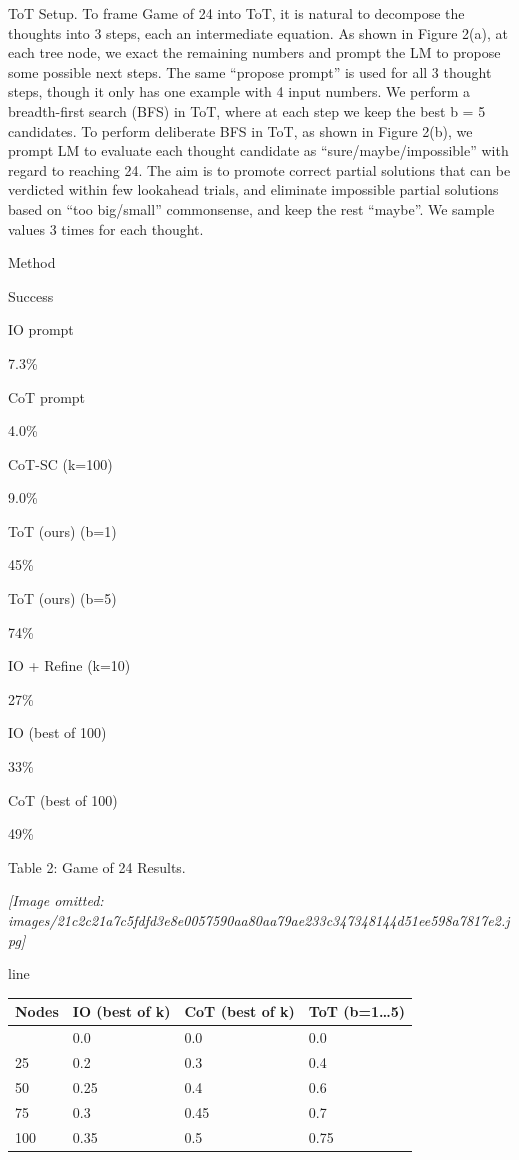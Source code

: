 \documentclass[
]{article}
\newcounter{none} %
\begin{document}
ToT Setup. To frame Game of 24 into ToT, it is natural to decompose the
thoughts into 3 steps, each an intermediate equation. As shown in Figure
2(a), at each tree node, we exact the remaining numbers and prompt the
LM to propose some possible next steps. The same ``propose prompt'' is
used for all 3 thought steps, though it only has one example with 4
input numbers. We perform a breadth-first search (BFS) in ToT, where at
each step we keep the best b = 5 candidates. To perform deliberate BFS
in ToT, as shown in Figure 2(b), we prompt LM to evaluate each thought
candidate as ``sure/maybe/impossible'' with regard to reaching 24. The
aim is to promote correct partial solutions that can be verdicted within
few lookahead trials, and eliminate impossible partial solutions based
on ``too big/small'' commonsense, and keep the rest ``maybe''. We sample
values 3 times for each thought.

Method

Success

IO prompt

7.3\%

CoT prompt

4.0\%

CoT-SC (k=100)

9.0\%

ToT (ours) (b=1)

45\%

ToT (ours) (b=5)

74\%

IO + Refine (k=10)

27\%

IO (best of 100)

33\%

CoT (best of 100)

49\%

Table 2: Game of 24 Results.

\textit{[Image omitted: images/21c2c21a7c5fdfd3e8e0057590aa80aa79ae233c347348144d51ee598a7817e2.jpg]}

line

{\def\LTcaptype{none} %
\begin{longtable}[]{@{}llll@{}}
\toprule\noalign{}
Nodes & IO (best of k) & CoT (best of k) & ToT (b=1\ldots5) \\
\midrule\noalign{}
\endhead
\bottomrule\noalign{}
\endlastfoot
0 & 0.0 & 0.0 & 0.0 \\
25 & 0.2 & 0.3 & 0.4 \\
50 & 0.25 & 0.4 & 0.6 \\
75 & 0.3 & 0.45 & 0.7 \\
100 & 0.35 & 0.5 & 0.75 \\
\end{longtable}
}
\end{document}
